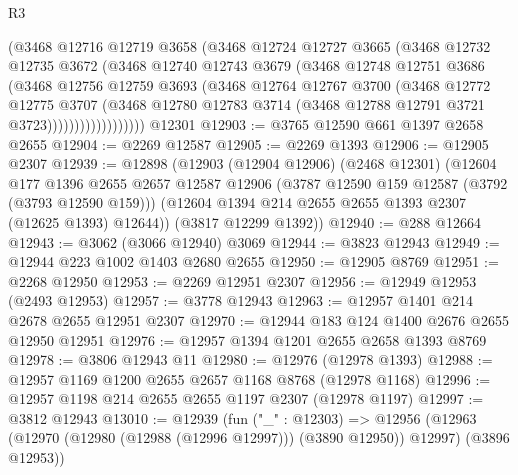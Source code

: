\begin{lexlean}{R3}
\begin{coremodule}
                    (@3468
                      @12716
                      @12719
                      @3658
                      (@3468
                        @12724
                        @12727
                        @3665
                        (@3468
                          @12732
                          @12735
                          @3672
                          (@3468
                            @12740
                            @12743
                            @3679
                            (@3468
                              @12748
                              @12751
                              @3686
                              (@3468
                                @12756
                                @12759
                                @3693
                                (@3468
                                  @12764
                                  @12767
                                  @3700
                                  (@3468
                                    @12772
                                    @12775
                                    @3707
                                    (@3468
                                      @12780
                                      @12783
                                      @3714
                                      (@3468 @12788 @12791 @3721 @3723))))))))))))))))))
    @12301
@12903 := @3765 @12590 @661 @1397 @2658 @2655
@12904 := @2269 @12587
@12905 := @2269 @1393
@12906 := @12905 @2307
@12939 := @12898
    (@12903
      (@12904 @12906)
      (@2468 @12301)
      (@12604
        @177
        @1396
        @2655
        @2657
        @12587
        @12906
        (@3787 @12590 @159 @12587 (@3792 (@3793 @12590 @159)))
        (@12604 @1394 @214 @2655 @2655 @1393 @2307 (@12625 @1393) @12644))
      (@3817 @12299 @1392))
@12940 := @288 @12664
@12943 := @3062 (@3066 @12940) @3069
@12944 := @3823 @12943
@12949 := @12944 @223 @1002 @1403 @2680 @2655
@12950 := @12905 @8769
@12951 := @2268 @12950
@12953 := @2269 @12951 @2307
@12956 := @12949 @12953 (@2493 @12953)
@12957 := @3778 @12943
@12963 := @12957 @1401 @214 @2678 @2655 @12951 @2307
@12970 := @12944 @183 @124 @1400 @2676 @2655 @12950 @12951
@12976 := @12957 @1394 @1201 @2655 @2658 @1393 @8769
@12978 := @3806 @12943 @11
@12980 := @12976 (@12978 @1393)
@12988 := @12957 @1169 @1200 @2655 @2657 @1168 @8768 (@12978 @1168)
@12996 := @12957 @1198 @214 @2655 @2655 @1197 @2307 (@12978 @1197)
@12997 := @3812 @12943
@13010 := @12939
    (fun ("_" : @12303) =>
    @12956 (@12963 (@12970 (@12980 (@12988 (@12996 @12997))) (@3890 @12950)) @12997) (@3896 @12953))

\end{coremodule}
\end{lexlean}

